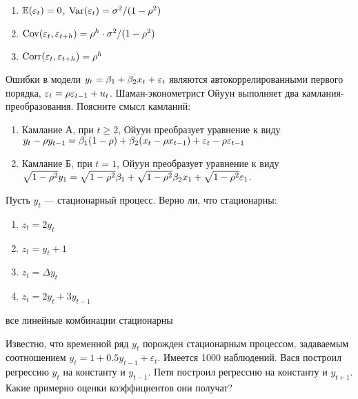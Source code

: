 \documentclass[pdftex,11pt,openany]{book}\usepackage[]{graphicx}\usepackage[]{color}
\begin{document}
\begin{solution}
\begin{enumerate}
\item $\mathbb{E}(\varepsilon_t)=0$, $\operatorname{Var}(\varepsilon_t)=\sigma^2/(1-\rho^2)$
\item $\operatorname{Cov}(\varepsilon_t,\varepsilon_{t+h})=\rho^h\cdot \sigma^2/(1-\rho^2)$
\item $\operatorname{Corr}(\varepsilon_t,\varepsilon_{t+h})=\rho^h$
\end{enumerate}
\end{solution}



\begin{problem}
Ошибки в модели $y_t=\beta_1+\beta_2 x_{t}+\varepsilon_t$ являются автокоррелированными первого порядка, $\varepsilon_t=\rho \varepsilon_{t-1}+u_t$. Шаман-эконометрист Ойуун выполняет два камлания-преобразования. Поясните смысл камланий:
\begin{enumerate}
\item Камлание А, при $t\geq 2$, Ойуун преобразует уравнение к виду $y_t-\rho y_{t-1}=\beta_1(1-\rho)+ \beta_2(x_t-\rho x_{t-1})+\varepsilon_t-\rho \varepsilon_{t-1}$
\item Камлание Б, при $t=1$, Ойуун преобразует уравнение к виду $\sqrt{1-\rho^2}y_1=\sqrt{1-\rho^2}\beta_1+\sqrt{1-\rho^2}\beta_2 x_1+\sqrt{1-\rho^2}\varepsilon_1$.
\end{enumerate}
\end{problem}

\begin{solution}
\end{solution}


\begin{problem}
Пусть $y_{t}$ --- стационарный процесс. Верно ли, что стационарны: 
\begin{enumerate}
\item $z_{t}=2y_{t}$ 
\item $z_{t}=y_{t}+1$ 
\item $z_{t}=\Delta y_{t}$ 
\item $z_{t}=2y_{t}+3y_{t-1}$ 
\end{enumerate} 
\end{problem}

\begin{solution}
все линейные комбинации стационарны
\end{solution}





\begin{problem}
Известно, что временной ряд $y_{t}$ порожден стационарным процессом, задаваемым соотношением $y_{t}=1+0.5y_{t-1}+\varepsilon_{t}$. Имеется 1000 наблюдений. Вася построил регрессию $y_{t}$ на константу и $y_{t-1}$. Петя построил регрессию на константу и $y_{t+1}$. Какие примерно оценки коэффициентов они получат? 
\end{problem}
\end{document}
